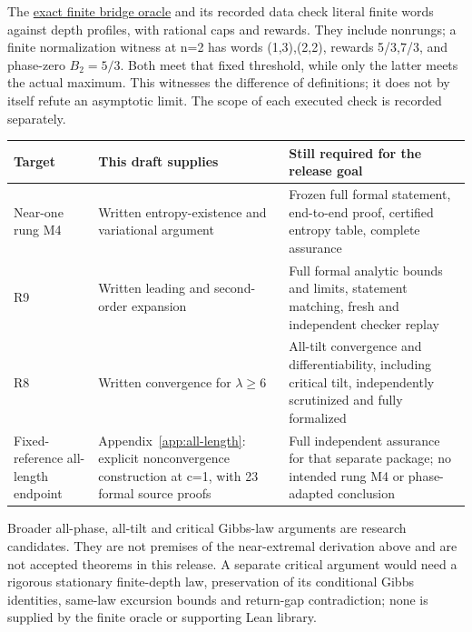 \documentclass[11pt,letterpaper]{article}
\begin{document}
The \href{../../certificates/external_problems/bridge.py}{exact finite bridge oracle} and its recorded data check literal finite words against depth profiles, with rational caps and rewards. They include nonrungs; a finite normalization witness at n=2 has words (1,3),(2,2), rewards 5/3,7/3, and phase-zero $B_2=5/3$. Both meet that fixed threshold, while only the latter meets the actual maximum. This witnesses the difference of definitions; it does not by itself refute an asymptotic limit. The scope of each executed check is recorded separately.

\begin{center}\small\begin{tabular}{@{}>{\raggedright\arraybackslash}p{}>{\raggedright\arraybackslash}p{}>{\raggedright\arraybackslash}p{}@{}}
\toprule

Target & This draft supplies & Still required for the release goal\\[0.6em]

\midrule

Near-one rung M4 & Written entropy-existence and variational argument & Frozen full formal statement, end-to-end proof, certified entropy table, complete assurance\\[0.6em]

R9 & Written leading and second-order expansion & Full formal analytic bounds and limits, statement matching, fresh and independent checker replay\\[0.6em]

R8 & Written convergence for $\lambda\ge6$ & All-tilt convergence and differentiability, including critical tilt, independently scrutinized and fully formalized\\[0.6em]

Fixed-reference all-length endpoint & Appendix~\ref{app:all-length}: explicit nonconvergence construction at c=1, with 23 formal source proofs & Full independent assurance for that separate package; no intended rung M4 or phase-adapted conclusion\\[0.6em]

\bottomrule\end{tabular}\end{center}

Broader all-phase, all-tilt and critical Gibbs-law arguments are research candidates. They are not premises of the near-extremal derivation above and are not accepted theorems in this release. A separate critical argument would need a rigorous stationary finite-depth law, preservation of its conditional Gibbs identities, same-law excursion bounds and return-gap contradiction; none is supplied by the finite oracle or supporting Lean library.
\end{document}
